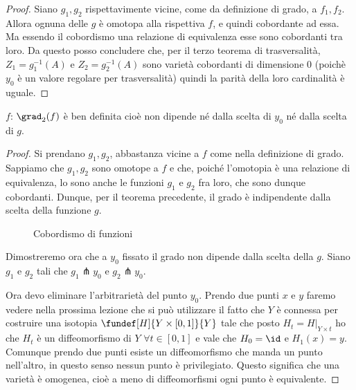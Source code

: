 \begin{proof}
 Siano $g_{1}, g_{2}$ rispettavimente vicine, come da definizione di grado, a $f_{1}, f_{2}$. Allora ognuna delle $g$ è omotopa alla rispettiva $f$, e quindi cobordante ad essa.
 Ma essendo il cobordismo una relazione di equivalenza esse sono cobordanti tra loro.
 Da questo posso concludere che, per il terzo teorema di trasversalità, $Z_{1} = g_{1}^{-1} (A)$ e $Z_{2} = g_{2}^{-1} (A)$ sono varietà cobordanti di dimensione 0 (poichè $y_0$ è un valore regolare per trasversalità) quindi la parità della loro cardinalità è uguale. 
\end{proof}

\begin{cor}
$f$: $\grad_{2}(f)$ è ben definita cioè non dipende né dalla scelta di $y_{0}$ né dalla scelta di $g$. 
\end{cor}

\begin{proof}
 Si prendano $g_{1}, g_{2}$, abbastanza vicine a $f$ come nella definizione di grado.
 Sappiamo che $g_{1}, g_{2}$ sono omotope a $f$ e che, poiché l'omotopia è una relazione di equivalenza, lo sono anche le funzioni $g_{1}$ e $g_{2}$ fra loro, che sono dunque cobordanti. Dunque, per il teorema precedente, il grado è indipendente dalla scelta della funzione $g$.
 
\begin{figure}
    \centering %
    
    \caption{Cobordismo di funzioni}
\end{figure}
 

 Dimostreremo ora che a $y_{0}$ fissato il grado non dipende dalla scelta della $g$. Siano $g_{1}$ e $g_{2}$ tali che $g_1 \pitchfork {y_0}$ e $g_{2} \pitchfork {y_{0}}$.
 
Ora devo eliminare l'arbitrarietà del punto $y_{0}$. Prendo due punti $x$ e $y$ faremo vedere nella prossima lezione che si può utilizzare il fatto che $Y$ è connessa per costruire una isotopia
$\fundef[H]{Y \times [0,1]}{Y}$ tale che posto $H_{t} = H|_{Y \times {t}}$ ho che $H_{t}$ è un diffeomorfismo di $Y$ $\forall t \in [0,1]$  e vale che $H_{0} = \id$ e $H_{1} (x) = y$.
Comunque prendo due punti esiste un diffeomorfismo che manda un punto nell'altro, in questo senso nessun punto è privilegiato. Questo significa che una varietà è omogenea, cioè a meno di 
diffeomorfismi ogni punto è equivalente.
\end{proof}



